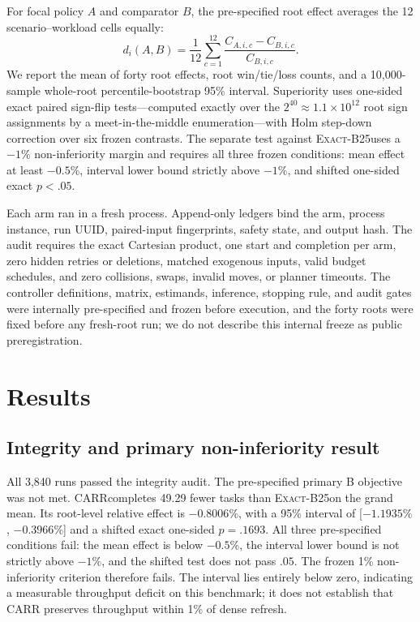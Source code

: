 \documentclass[sigconf,anonymous,review]{acmart}
\newcommand{\carr}{\textsc{CARR}}
\newcommand{\exactdense}{\textsc{Exact-B25}}
\begin{document}
For focal policy $A$ and comparator $B$, the pre-specified root effect averages
the 12 scenario--workload cells equally:
\begin{equation}
 d_i(A,B)=\frac{1}{12}\sum_{c=1}^{12}
 \frac{C_{A,i,c}-C_{B,i,c}}{C_{B,i,c}}.
\end{equation}
We report the mean of forty root effects, root win/tie/loss counts, and a
10,000-sample whole-root percentile-bootstrap 95\% interval. Superiority uses
one-sided exact paired sign-flip tests---computed exactly over the
$2^{40}\approx1.1\times10^{12}$ root sign assignments by a meet-in-the-middle
enumeration---with Holm step-down correction over six frozen contrasts. The
separate test against \exactdense uses a $-1\%$ non-inferiority margin and
requires all three frozen conditions: mean effect at least $-0.5\%$, interval
lower bound strictly above $-1\%$, and shifted one-sided exact $p<.05$.

Each arm ran in a fresh process. Append-only ledgers bind the arm, process
instance, run UUID, paired-input fingerprints, safety state, and output hash.
The audit requires the exact Cartesian product, one start and completion per
arm, zero hidden retries or deletions, matched exogenous inputs, valid budget
schedules, and zero collisions, swaps, invalid moves, or planner timeouts.
The controller definitions, matrix, estimands, inference, stopping
rule, and audit gates were internally pre-specified and frozen before
execution, and the forty roots were fixed before any fresh-root run; we do not
describe this internal freeze as public preregistration.

\section{Results}

\subsection{Integrity and primary non-inferiority result}

All 3{,}840 runs passed the integrity audit. The pre-specified primary B
objective was not met. \carr completes 49.29 fewer tasks than \exactdense on
the grand mean. Its root-level relative effect is $-0.8006\%$, with a 95\%
interval of [$-1.1935\%$, $-0.3966\%$] and a shifted exact one-sided
$p=.1693$. All three pre-specified conditions fail: the mean effect is below
$-0.5\%$, the interval lower bound is not strictly above $-1\%$, and the
shifted test does not pass $.05$. The frozen 1\% non-inferiority criterion
therefore fails. The interval lies entirely below zero, indicating a measurable
throughput deficit on this benchmark; it does not establish that \carr
preserves throughput within 1\% of dense refresh.
\end{document}
